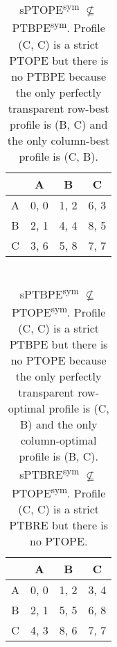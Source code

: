 \begin{table}
	\caption{
		sPTOPE\textsuperscript{sym} $\not\subseteq$ PTBPE\textsuperscript{sym}.
		Profile (C, C) is a strict PTOPE but there is no PTBPE because the only perfectly transparent row-best profile is (B, C) and the only column-best profile is (C, B).
	}
	\label{tab:sptope-not-sub-ptbpe}
	\centering
	\begin{tabular}{|c|c|c|c|}
		\hline
			& A		& B	   & C	  \\
		\hline
		A 		&\cellcolor{gray!70} 0, 0 &\cellcolor{gray!70} 1, 2 &\cellcolor{gray!20} 6, 3 \\
		\hline
		B		&\cellcolor{gray!70} 2, 1 &\cellcolor{gray!20} 4, 4 &\cellcolor{gray!20} 8, 5 \\
		\hline
		C		&\cellcolor{gray!20} 3, 6 &\cellcolor{gray!20} 5, 8 &\cellcolor{gray!00} 7, 7 \\
		\hline
	\end{tabular}
\end{table}

\begin{table}
	\caption{
		\\sPTBPE\textsuperscript{sym} $\not\subseteq$ PTOPE\textsuperscript{sym}.
		Profile (C, C) is a strict PTBPE but there is no PTOPE because the only perfectly transparent row-optimal profile is (C, B) and the only column-optimal profile is (B, C).\vspace{5pt}\\
		sPTBRE\textsuperscript{sym} $\not\subseteq$ PTOPE\textsuperscript{sym}.
		Profile (C, C) is a strict PTBRE but there is no PTOPE.
	}
	\label{tab:sptbpe-not-sub-ptope}
	\label{tab:sptbre-not-sub-ptope}
	\centering
	\begin{tabular}{|c|c|c|c|}
		\hline
			& A		& B	   & C	  \\
		\hline
		A 		&\cellcolor{gray!70} 0, 0 &\cellcolor{gray!70} 1, 2 &\cellcolor{gray!70} 3, 4 \\
		\hline
		B		&\cellcolor{gray!70} 2, 1 &\cellcolor{gray!20} 5, 5 &\cellcolor{gray!20} 6, 8 \\
		\hline
		C		&\cellcolor{gray!70} 4, 3 &\cellcolor{gray!20} 8, 6 &\cellcolor{gray!00} 7, 7 \\
		\hline
	\end{tabular}
\end{table}

